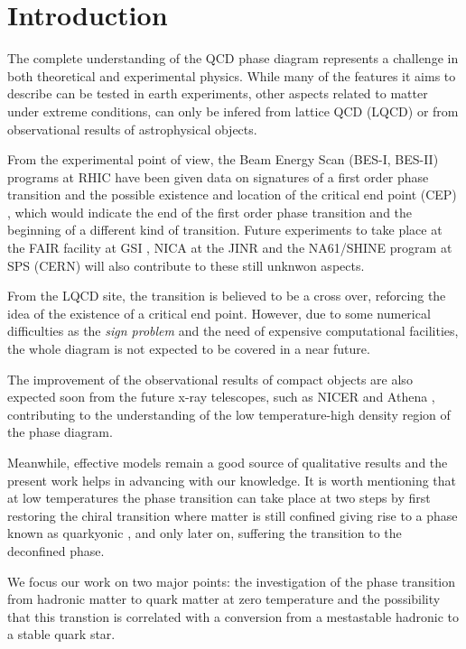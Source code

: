 \documentclass[prc, reprint, amsmath, floatfix,10pt]{revtex4-1}
\begin{document}
\section{Introduction}

The complete understanding of the QCD phase diagram represents a challenge in both theoretical and experimental physics. While many of the features it aims to describe can be tested in earth experiments, other aspects related to matter under extreme conditions, can only be infered from lattice QCD (LQCD) \cite{lqcd} or from observational results of astrophysical objects.

From the experimental point of view, the Beam Energy Scan (BES-I, BES-II) programs at RHIC have been given data on signatures of a first order phase transition and
the possible existence and location of the critical end point (CEP) \cite{BES}, which would indicate the end of the first order phase transition and the beginning of a different kind of transition. Future experiments to take place at the FAIR facility at GSI \cite{FAIR} , NICA at the JINR \cite{NICA} and the NA61/SHINE program at SPS (CERN)  \cite{NA61} will also contribute to these still unknwon aspects.

From the LQCD site, the transition is believed to be a cross over, reforcing the idea of the existence of a critical end point. However, due to some numerical difficulties as the {\it sign problem} and the need of expensive computational facilities, the whole diagram is not expected to be covered in a near future.

The improvement of the observational results of compact objects are also expected soon from the future x-ray telescopes, such as NICER \cite{NICER} and Athena \cite{ATHENA}, contributing to the understanding of the low temperature-high density region of the phase diagram.

Meanwhile, effective models remain a good source of qualitative results and the present work helps in advancing with our knowledge. It is worth mentioning that at low temperatures the phase transition can take place at two steps by first restoring the chiral transition where matter is still confined giving rise to a phase known as quarkyonic \cite{quarkyonic}, and only later on, suffering the transition to the deconfined phase. 

We focus our work on two major points: the investigation of the phase transition from hadronic matter to quark matter at zero temperature and the possibility that this transtion is correlated with a conversion from a mestastable hadronic to a stable quark star.
\end{document}

